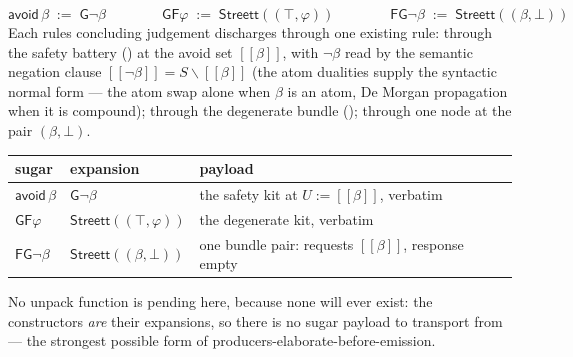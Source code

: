 

\begin{brecipe}\label{rec:sb-filled}
\[
\mathsf{avoid}\,\beta \;:=\; \mathsf{G}\neg\beta
\qquad\qquad
\mathsf{GF}\varphi \;:=\; \mathsf{Streett}((\top, \varphi))
\qquad\qquad
\mathsf{FG}\neg\beta \;:=\; \mathsf{Streett}((\beta, \bot))
\]
Each rule\textquotesingle s concluding judgement discharges through one
existing rule:  through the safety battery
() at the
avoid set $[\![\beta]\!]$, with $\neg\beta$ read by the semantic
negation clause $[\![\neg\beta]\!] = S \smallsetminus [\![\beta]\!]$
(the  atom dualities supply the syntactic normal
form --- the atom swap alone when $\beta$ is an atom, De Morgan
propagation when it is compound);  through the
degenerate bundle (); 
through one  node at the pair
$(\beta, \bot)$.
\end{brecipe}

\begin{brecipe}\label{rec:sb-transport}
\begin{center}\small
\begin{tabular}{@{}lll@{}}
\textbf{sugar} & \textbf{expansion} & \textbf{payload}\\
\midrule
$\mathsf{avoid}\,\beta$ & $\mathsf{G}\neg\beta$ & the safety kit at $U := [\![\beta]\!]$, verbatim\\
$\mathsf{GF}\varphi$ & $\mathsf{Streett}((\top, \varphi))$ & the degenerate kit, verbatim\\
$\mathsf{FG}\neg\beta$ & $\mathsf{Streett}((\beta, \bot))$ & one bundle pair: requests $[\![\beta]\!]$, response empty\\
\end{tabular}
\end{center}
No unpack function is pending here, because none will ever exist: the
constructors \emph{are} their expansions, so there is no sugar payload
to transport from --- the strongest possible form of
producers-elaborate-before-emission.
\end{brecipe}

